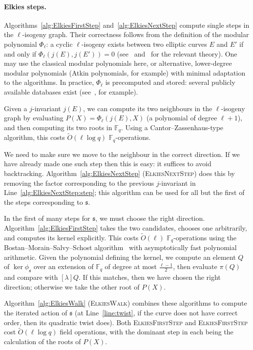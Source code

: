 \documentclass{llncs}
\newcommand{\F}{\mathbb{F}}
\newcommand{\softO}{\tilde{O}}
\newcommand{\algstyle}[1]{\textsc{#1}}
\renewcommand{\frak}{\mathfrak}
\begin{document}
\paragraph{Elkies steps.}
Algorithms~\ref{alg:ElkiesFirstStep}
and~\ref{alg:ElkiesNextStep} 
compute single steps in the $\ell$-isogeny graph.
Their correctness
follows from the definition of the modular polynomial $\Phi_\ell$:
a cyclic $\ell$-isogeny exists between two elliptic
curves $E$ and $E'$ if and only if $\Phi_\ell(j(E), j(E')) = 0$
(see~\cite[\S6]{schoof95} and~\cite[\S3]{Elkies98} for the relevant theory).
One may use the classical modular polynomials here,
or alternative, lower-degree modular polynomials
(Atkin polynomials, for example)
with minimal adaptation to the algorithms.
In practice, $\Phi_\ell$ is precomputed and stored:
several publicly available databases exist (see~\cite{Echidna}, for example).

Given a $j$-invariant $j(E)$,
we can compute its two neighbours in the $\ell$-isogeny graph
by evaluating $P(X) = \Phi_\ell(j(E),X)$
(a polynomial of degree $\ell+1$),
and then computing its two roots in $\F_q$.
Using a Cantor--Zassenhaus-type algorithm,
this costs
$\softO(\ell\log q)$ $\F_q$-operations.

We need to make sure we move to the neighbour in the correct direction.
If we have already made one such step then this is easy:
it suffices to avoid backtracking.
Algorithm~\ref{alg:ElkiesNextStep} (\algstyle{ElkiesNextStep})
does this by
removing the factor corresponding to the previous $j$-invariant 
in Line~\ref{alg:ElkiesNextStep:step};
this algorithm can be used for all but the first of the steps
corresponding to $\frak{s}$.

In the first of many steps for $\frak{s}$,
we must choose the right direction.
Algorithm~\ref{alg:ElkiesFirstStep}
takes the two candidates,
chooses one arbitrarily,
and computes its kernel explicitly.
This costs $\softO(\ell)$ $\F_q$-operations
using the Bostan--Morain--Salvy--Schost algorithm~\cite{BMSS08}
with asymptotically fast polynomial arithmetic.
Given the polynomial defining the kernel,
we compute an element $Q$ of $\ker\phi_\frak{s}$
over an extension of $\F_q$ of degree at most $\frac{\ell-1}{2}$,
then evaluate $\pi(Q)$ and compare with $[\lambda]Q$.
If this matches, then we have chosen the right direction;
otherwise we take the other root of $P(X)$.

Algorithm~\ref{alg:ElkiesWalk} (\algstyle{ElkiesWalk}) 
combines these algorithms
to compute the iterated action of $\frak{s}$
(at Line~\ref{line:twist}, if the curve does not have correct order,
then its quadratic twist does).
Both \algstyle{ElkiesFirstStep} and \algstyle{ElkiesFirstStep}
cost $\softO(\ell\log q)$ field operations,
with the dominant step in each being the calculation of the roots of $P(X)$.
\end{document}
